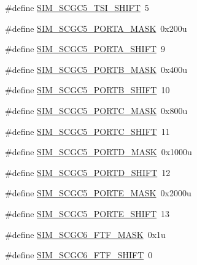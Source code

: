 \begin{DoxyCompactItemize}
\item 
\#define \hyperlink{group___s_i_m___register___masks_ga3e9511b0e9cf6b524a0a405b172038da}{S\+I\+M\+\_\+\+S\+C\+G\+C5\+\_\+\+T\+S\+I\+\_\+\+S\+H\+I\+FT}~5
\item 
\#define \hyperlink{group___s_i_m___register___masks_ga9c4853233394870202cccd7844fc8a56}{S\+I\+M\+\_\+\+S\+C\+G\+C5\+\_\+\+P\+O\+R\+T\+A\+\_\+\+M\+A\+SK}~0x200u
\item 
\#define \hyperlink{group___s_i_m___register___masks_gaa7a1683eaa07a5c5adcaddf4b99ed83a}{S\+I\+M\+\_\+\+S\+C\+G\+C5\+\_\+\+P\+O\+R\+T\+A\+\_\+\+S\+H\+I\+FT}~9
\item 
\#define \hyperlink{group___s_i_m___register___masks_ga5509cf72c7508dd77f0a1a9e631943e8}{S\+I\+M\+\_\+\+S\+C\+G\+C5\+\_\+\+P\+O\+R\+T\+B\+\_\+\+M\+A\+SK}~0x400u
\item 
\#define \hyperlink{group___s_i_m___register___masks_ga491c4800f5437a9e2d235a77819e434d}{S\+I\+M\+\_\+\+S\+C\+G\+C5\+\_\+\+P\+O\+R\+T\+B\+\_\+\+S\+H\+I\+FT}~10
\item 
\#define \hyperlink{group___s_i_m___register___masks_gaac31449d101ad0d05f2bed682571be35}{S\+I\+M\+\_\+\+S\+C\+G\+C5\+\_\+\+P\+O\+R\+T\+C\+\_\+\+M\+A\+SK}~0x800u
\item 
\#define \hyperlink{group___s_i_m___register___masks_gae141a6d4af583e7410d0120442b1012f}{S\+I\+M\+\_\+\+S\+C\+G\+C5\+\_\+\+P\+O\+R\+T\+C\+\_\+\+S\+H\+I\+FT}~11
\item 
\#define \hyperlink{group___s_i_m___register___masks_ga723a55222eb5f8fd25da5c956aa50e7b}{S\+I\+M\+\_\+\+S\+C\+G\+C5\+\_\+\+P\+O\+R\+T\+D\+\_\+\+M\+A\+SK}~0x1000u
\item 
\#define \hyperlink{group___s_i_m___register___masks_gad5f267781fcedf0fcdc0c4d3607c10cb}{S\+I\+M\+\_\+\+S\+C\+G\+C5\+\_\+\+P\+O\+R\+T\+D\+\_\+\+S\+H\+I\+FT}~12
\item 
\#define \hyperlink{group___s_i_m___register___masks_ga3d5e3e51d345fe424a4f24aa9ae73dc1}{S\+I\+M\+\_\+\+S\+C\+G\+C5\+\_\+\+P\+O\+R\+T\+E\+\_\+\+M\+A\+SK}~0x2000u
\item 
\#define \hyperlink{group___s_i_m___register___masks_gae717813cf38c35e5e4ea4243e939b4bc}{S\+I\+M\+\_\+\+S\+C\+G\+C5\+\_\+\+P\+O\+R\+T\+E\+\_\+\+S\+H\+I\+FT}~13
\item 
\#define \hyperlink{group___s_i_m___register___masks_ga949452096cb8609fdb3503dda3f9f729}{S\+I\+M\+\_\+\+S\+C\+G\+C6\+\_\+\+F\+T\+F\+\_\+\+M\+A\+SK}~0x1u
\item 
\#define \hyperlink{group___s_i_m___register___masks_gaf767cc087ed5983b84e79996586efb12}{S\+I\+M\+\_\+\+S\+C\+G\+C6\+\_\+\+F\+T\+F\+\_\+\+S\+H\+I\+FT}~0

\end{DoxyCompactItemize}

